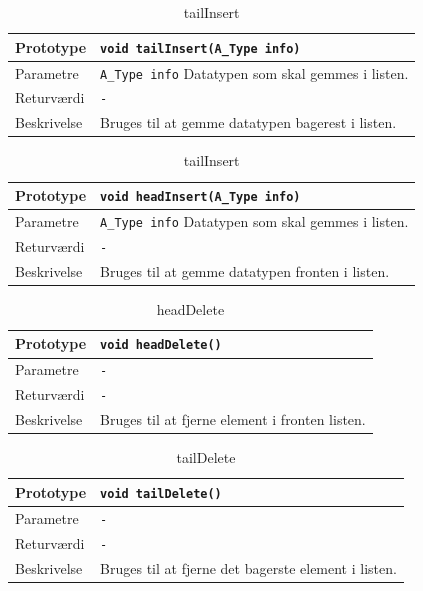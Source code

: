 \begin{table}[ht]
\begin{tabularx}{\textwidth}{| L{2.5 cm} | Z |} \hline
Prototype & \texttt{void tailInsert(A\_Type info)} \\\hline
Parametre & \texttt{A\_Type info} \newline
Datatypen som skal gemmes i listen. \\\hline
Returværdi & \texttt{-} \\\hline
Beskrivelse & Bruges til at gemme datatypen bagerest i listen. \\\hline
\end{tabularx}
\caption{tailInsert}
\label{table:DoublyLinkedList_tailInsert}
\end{table}

\begin{table}[ht]
\begin{tabularx}{\textwidth}{| L{2.5 cm} | Z |} \hline
Prototype & \texttt{void headInsert(A\_Type info)} \\\hline
Parametre & \texttt{A\_Type info} \newline
Datatypen som skal gemmes i listen. \\\hline
Returværdi & \texttt{-} \\\hline
Beskrivelse & Bruges til at gemme datatypen fronten i listen. \\\hline
\end{tabularx}
\caption{tailInsert}
\label{table:DoublyLinkedList_headInsert}
\end{table}

\begin{table}[ht]
\begin{tabularx}{\textwidth}{| L{2.5 cm} | Z |} \hline
Prototype & \texttt{void headDelete()} \\\hline
Parametre & \texttt{-} \\\hline
Returværdi & \texttt{-} \\\hline
Beskrivelse & Bruges til at fjerne element i fronten listen. \\\hline
\end{tabularx}
\caption{headDelete}
\label{table:DoublyLinkedList_headDelete}
\end{table}


\begin{table}[ht]
\begin{tabularx}{\textwidth}{| L{2.5 cm} | Z |} \hline
Prototype & \texttt{void tailDelete()} \\\hline
Parametre & \texttt{-} \\\hline
Returværdi & \texttt{-} \\\hline
Beskrivelse & Bruges til at fjerne det bagerste element i listen. \\\hline
\end{tabularx}
\caption{tailDelete}
\label{table:DoublyLinkedList_tailDelete}
\end{table}


